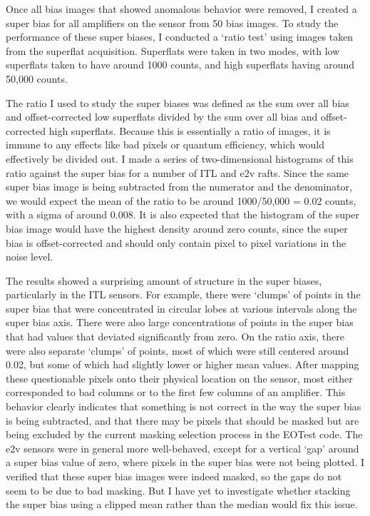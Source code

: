 Once all bias images that showed anomalous behavior were removed, I created a super bias for all amplifiers on the sensor from 50 bias images. To study the performance of these super biases, I conducted a ‘ratio test’ using images taken from the superflat acquisition. Superflats were taken in two modes, with low superflats taken to have around 1000 counts, and high superflats having around 50,000 counts. 

The ratio I used to study the super biases was defined as the sum over all bias and offset-corrected low superflats divided by the sum over all bias and offset-corrected high superflats. Because this is essentially a ratio of images, it is immune to any effects like bad pixels or quantum efficiency, which would effectively be divided out. I made a series of two-dimensional histograms of this ratio against the super bias for a number of ITL and e2v rafts. Since the same super bias image is being subtracted from the numerator and the denominator, we would expect the mean of the ratio to be around 1000/50,000 = 0.02 counts, with a sigma of around 0.008. It is also expected that the histogram of the super bias image would have the highest density around zero counts, since the super bias is offset-corrected and should only contain pixel to pixel variations in the noise level. 

The results showed a surprising amount of structure in the super biases, particularly in the ITL sensors. For example, there were ‘clumps’ of points in the super bias that were concentrated in circular lobes at various intervals along the super bias axis. There were also large concentrations of points in the super bias that had values that deviated significantly from zero. On the ratio axis, there were also separate ‘clumps’ of points, most of which were still centered around 0.02, but some of which had slightly lower or higher mean values. After mapping these questionable pixels onto their physical location on the sensor, most either corresponded to bad columns or to the first few columns of an amplifier. This behavior clearly indicates that something is not correct in the way the super bias is being subtracted, and that there may be pixels that should be masked but are being excluded by the current masking selection process in the EOTest code. The e2v sensors were in general more well-behaved, except for a vertical ‘gap’ around a super bias value of zero, where pixels in the super bias were not being plotted. I verified that these super bias images were indeed masked, so the gaps do not seem to be due to bad masking. But I have yet to investigate whether stacking the super bias using a clipped mean rather than the median would fix this issue. 

